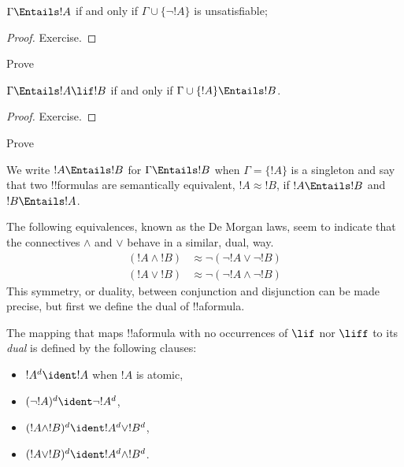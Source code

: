 \documentclass[../../../include/open-logic-section]{subfiles}
\begin{document}
\begin{prop}
  $\Gamma \Entails !A$ if and only if $\Gamma \cup \{\lnot !A\}$
  is unsatisfiable; 
\end{prop}

\begin{proof}
Exercise.
\end{proof}

\begin{prob}
Prove 
\end{prob}

\begin{thm}
   $\Gamma \Entails !A \lif !B$ if and only
  if $\Gamma \cup \{!A\} \Entails !B$.
\end{thm}

\begin{proof}
Exercise.
\end{proof}

\begin{prob}
Prove 
\end{prob}

We write $!A \Entails !B$ for $\Gamma \Entails !B$ when $\Gamma = \{!A\}$ is a singleton and say that two !!{formula}s are semantically equivalent, $!A \approx !B$, if $!A \Entails !B$ and $!B \Entails !A$.

The following equivalences, known as the De Morgan laws, seem to indicate that the connectives $\land$ and $\lor$ behave in a similar, dual, way. 
  \begin{align*}
    ({!A} \land {!B}) &\approx \lnot(\lnot{!A} \lor \lnot{!B})\\
    ({!A} \lor {!B}) &\approx \lnot(\lnot{!A} \land \lnot{!B})
  \end{align*}
This symmetry, or duality, between conjunction and disjunction can be made precise, but first we define the dual of !!a{formula}.

\begin{defn}
The mapping that maps !!a{formula} with no occurrences of $\lif$ nor $\liff$ to its \emph{dual} is defined by the following clauses:
\begin{itemize}
  \item $!A^d \ident !A$ when $!A$ is atomic,
  \item $(\lnot !A )^d \ident \lnot !A^d$,
  \item $(!A \land !B)^d \ident !A^d \lor !B^d$,
  \item $(!A \lor !B)^d \ident !A^d \land !B^d$.
\end{itemize}
\end{defn}
\end{document}
